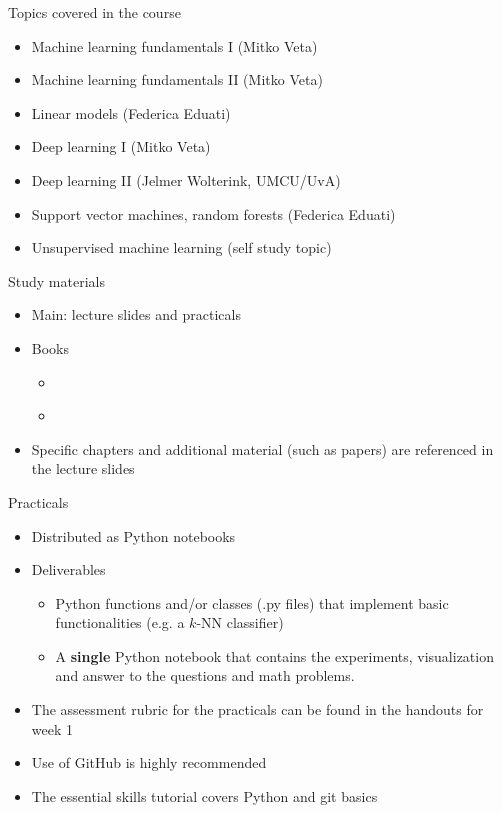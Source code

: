 \documentclass[notes]{beamer}          %
\begin{document}
\begin{frame}{Topics covered in the course}
\begin{itemize}
    \item Machine learning fundamentals I (Mitko Veta)
    \item Machine learning fundamentals II (Mitko Veta)
    \item Linear models (Federica Eduati)
    \item Deep learning I (Mitko Veta)
    \item Deep learning II (Jelmer Wolterink, UMCU/UvA)
    \item Support vector machines, random forests (Federica Eduati)
    \item Unsupervised machine learning (self study topic)
\end{itemize}
\end{frame}

\begin{frame}{Study materials}
\begin{itemize}
\item Main: lecture slides and practicals
\item Books
\begin{itemize}
    \item \cite{deeplearning}
    \item \cite{elements}
\end{itemize}
\item Specific chapters and additional material (such as papers) are referenced in the lecture slides
\end{itemize}
\end{frame}

\begin{frame}{Practicals}
\begin{itemize}
    \item Distributed as Python notebooks
    \item Deliverables
    \begin{itemize}
        \item Python functions and/or classes (.py files) that implement basic functionalities (e.g. a $k$-NN classifier)
        \item A \textbf{single} Python notebook that contains the experiments, visualization and answer to the questions and math problems.
    \end{itemize}
    \item The assessment rubric for the practicals can be found in the handouts for week 1
    \item Use of GitHub is highly recommended 
    \item The essential skills tutorial covers Python and git basics
\end{itemize}    
\end{frame}
\end{document}
